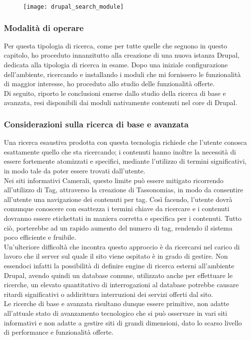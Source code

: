		\begin{figure}[htbp]
			\begin{center}
				\texttt{[image: drupal\_search\_module]}
			\end{center}
		\end{figure}
	
			\subsubsection{Modalità di operare}
			Per questa tipologia di ricerca, come per tutte quelle che seguono in questo capitolo, ho proceduto innanzitutto alla creazione di una nuova istanza \gls{Drupal}, dedicata alla tipologia di ricerca in esame. Dopo una iniziale configurazione dell'ambiente, ricercando e installando i moduli che mi fornissero le funzionalità di maggior interesse, ho proceduto allo studio delle funzionalità offerte. \\
			Di seguito, riporto le conclusioni emerse dallo studio della ricerca di base e avanzata, resi disponibili dai moduli nativamente contenuti nel core di \gls{Drupal}.

			\subsubsection{Considerazioni sulla ricerca di base e avanzata}
			Una ricerca esaustiva prodotta con questa tecnologia richiede che l'utente conosca esattamente quello che sta ricercando; i contenuti hanno inoltre la necessità di essere fortemente atomizzati e specifici, mediante l'utilizzo di termini significativi, in modo tale da poter essere trovati dall'utente. \\
			Nei siti informativi Camerali, questo limite può essere mitigato ricorrendo all'utilizzo di \gls{Tag}, attraverso la creazione di \glspl{Tassonomia}, in modo da consentire all'utente una navigazione dei contenuti per tag. Così facendo, l'utente dovrà comunque conoscere con esattezza i termini chiave da ricercare e i contenuti dovranno essere etichettati in maniera corretta e specifica per i contenuti. Tutto ciò, porterebbe ad un rapido aumento del numero di tag, rendendo il sistema poco efficiente e fruibile. \\
			Un'ulteriore difficoltà che incontra questo approccio è da ricercarsi nel carico di lavoro che il server sul quale il sito viene ospitato è in grado di gestire. Non essendoci infatti la possibilità di definire engine di ricerca esterni all'ambiente \gls{Drupal}, avendo quindi un database comune, utilizzato anche per effettuare le ricerche, un elevato quantitativo di interrogazioni al database potrebbe causare ritardi significativi o addirittura interruzioni dei servizi offerti dal sito. \\
			Le ricerche di base e avanzata risultano dunque essere primitive, non adatte all'attuale stato di avanzamento tecnologico che si può osservare in vari siti informativi e non adatte a gestire siti di grandi dimensioni, dato lo scarso livello di performance e funzionalità offerte.
		
